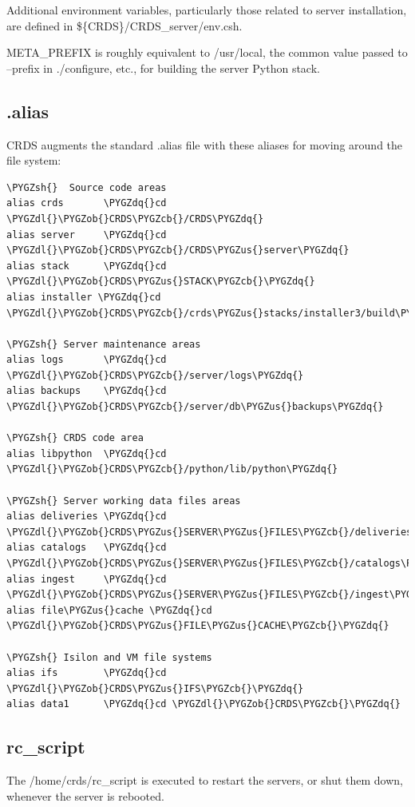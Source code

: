 \documentclass[letterpaper,10pt,english]{sphinxmanual}
\def\PYGZus{\char`\_}
\def\PYGZob{\char`\{}
\def\PYGZcb{\char`\}}
\def\PYGZsh{\char`\#}
\def\PYGZdl{\char`\$}
\def\PYGZdq{\char`\"}
\begin{document}
Additional environment variables, particularly those related to server installation, are defined in
\$\{CRDS\}/CRDS\_server/env.csh.

META\_PREFIX is roughly equivalent to /usr/local,  the common value passed to --prefix in ./configure,  etc.,
for building the server Python stack.


\subsection{.alias}
\label{server_guide:alias}
CRDS augments the standard .alias file with these aliases for moving around the file system:

\begin{Verbatim}[commandchars=\\\{\}]
\PYGZsh{}  Source code areas
alias crds       \PYGZdq{}cd \PYGZdl{}\PYGZob{}CRDS\PYGZcb{}/CRDS\PYGZdq{}
alias server     \PYGZdq{}cd \PYGZdl{}\PYGZob{}CRDS\PYGZcb{}/CRDS\PYGZus{}server\PYGZdq{}
alias stack      \PYGZdq{}cd \PYGZdl{}\PYGZob{}CRDS\PYGZus{}STACK\PYGZcb{}\PYGZdq{}
alias installer \PYGZdq{}cd \PYGZdl{}\PYGZob{}CRDS\PYGZcb{}/crds\PYGZus{}stacks/installer3/build\PYGZdq{}

\PYGZsh{} Server maintenance areas
alias logs       \PYGZdq{}cd \PYGZdl{}\PYGZob{}CRDS\PYGZcb{}/server/logs\PYGZdq{}
alias backups    \PYGZdq{}cd \PYGZdl{}\PYGZob{}CRDS\PYGZcb{}/server/db\PYGZus{}backups\PYGZdq{}

\PYGZsh{} CRDS code area
alias libpython  \PYGZdq{}cd \PYGZdl{}\PYGZob{}CRDS\PYGZcb{}/python/lib/python\PYGZdq{}

\PYGZsh{} Server working data files areas
alias deliveries \PYGZdq{}cd \PYGZdl{}\PYGZob{}CRDS\PYGZus{}SERVER\PYGZus{}FILES\PYGZcb{}/deliveries\PYGZdq{}
alias catalogs   \PYGZdq{}cd \PYGZdl{}\PYGZob{}CRDS\PYGZus{}SERVER\PYGZus{}FILES\PYGZcb{}/catalogs\PYGZdq{}
alias ingest     \PYGZdq{}cd \PYGZdl{}\PYGZob{}CRDS\PYGZus{}SERVER\PYGZus{}FILES\PYGZcb{}/ingest\PYGZdq{}
alias file\PYGZus{}cache \PYGZdq{}cd \PYGZdl{}\PYGZob{}CRDS\PYGZus{}FILE\PYGZus{}CACHE\PYGZcb{}\PYGZdq{}

\PYGZsh{} Isilon and VM file systems
alias ifs        \PYGZdq{}cd \PYGZdl{}\PYGZob{}CRDS\PYGZus{}IFS\PYGZcb{}\PYGZdq{}
alias data1      \PYGZdq{}cd \PYGZdl{}\PYGZob{}CRDS\PYGZcb{}\PYGZdq{}
\end{Verbatim}


\subsection{rc\_script}
\label{server_guide:rc-script}
The /home/crds/rc\_script is executed to restart the servers,  or shut them down,  whenever the server is rebooted.
\end{document}
